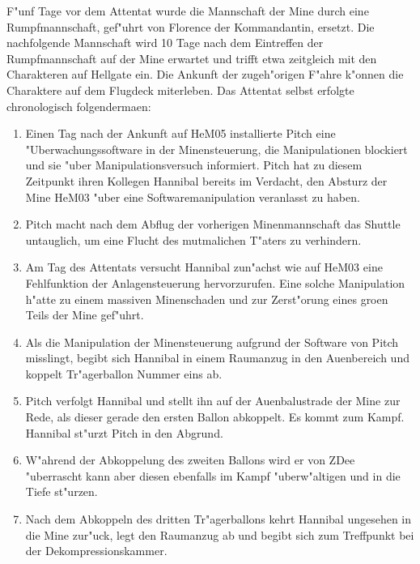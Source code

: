 
F"unf Tage vor dem Attentat wurde die Mannschaft der Mine durch eine Rumpfmannschaft, gef"uhrt von Florence der Kommandantin, ersetzt. Die nachfolgende Mannschaft wird 10 Tage nach dem Eintreffen der Rumpfmannschaft auf der Mine erwartet und trifft etwa zeitgleich mit den Charakteren auf Hellgate ein. Die Ankunft der zugeh"origen F"ahre k"onnen die Charaktere auf dem Flugdeck miterleben. Das Attentat selbst erfolgte chronologisch folgenderma\3en:

\begin{enumerate}
	\item Einen Tag nach der Ankunft auf HeM05 installierte Pitch eine "Uberwachungssoftware in der Minensteuerung, die Manipulationen 	
		blockiert und sie "uber Manipulationsversuch informiert. Pitch hat zu diesem Zeitpunkt ihren Kollegen Hannibal bereits im Verdacht, den Absturz der Mine HeM03 "uber eine Softwaremanipulation veranlasst zu haben.
	\item Pitch macht nach dem Abflug der vorherigen Minenmannschaft das Shuttle untauglich, um eine Flucht des mutma\3lichen T"aters zu 
		verhindern.
	\item Am Tag des Attentats versucht Hannibal zun"achst wie auf HeM03 eine Fehlfunktion der Anlagensteuerung hervorzurufen. Eine solche 
		Manipulation h"atte zu einem massiven Minenschaden und zur Zerst"orung eines gro\3en Teils der Mine gef"uhrt.
	\item Als die Manipulation der Minensteuerung aufgrund der Software von Pitch misslingt, begibt sich Hannibal in einem Raumanzug in den 
		Au\3enbereich und koppelt Tr"agerballon Nummer eins ab.
	\item Pitch verfolgt Hannibal und stellt ihn auf der Au\3enbalustrade der Mine zur Rede, als dieser gerade den ersten Ballon abkoppelt. 
		Es kommt zum Kampf. Hannibal st"urzt Pitch in den Abgrund.
	\item W"ahrend der Abkoppelung des zweiten Ballons wird er von ZDee "uberrascht kann aber diesen ebenfalls im Kampf "uberw"altigen und 
		in die Tiefe st"urzen.
	\item Nach dem Abkoppeln des dritten Tr"agerballons kehrt Hannibal ungesehen in die Mine zur"uck, legt den Raumanzug ab und begibt sich 
		zum Treffpunkt bei der Dekompressionskammer.
\end{enumerate}


